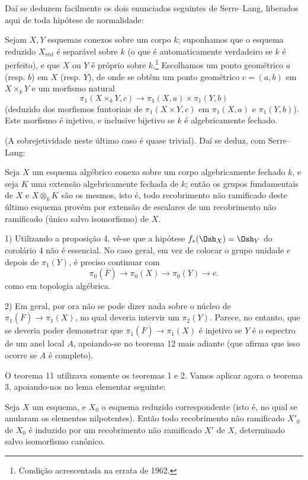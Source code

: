 Daí se deduzem facilmente os dois enunciados seguintes de Serre--Lang,
liberados aqui de toda hipótese de normalidade:

 Sejam $X,Y$ esquemas conexos sobre um corpo $k$;
suponhamos que o esquema reduzido $X_{\mathrm{réd}}$ é separável sobre $k$
(o que é automaticamente verdadeiro se $k$ é perfeito), e que $X$ ou $Y$ é
próprio sobre $k$.\footnote{Condição acrescentada na errata de 1962.}
Escolhamos um ponto geométrico $a$ (resp. $b$) em $X$ (resp. $Y$), de onde se
obtêm um ponto geométrico $c=(a,b)$ em $X\times_kY$ e um morfismo natural
\[
  \pi_1(X\times_kY,c)\longrightarrow
  \pi_1(X,a)\times\pi_1(Y,b)
\]
(deduzido dos morfismos funtoriais de $\pi_1(X\times Y,c)$ em $\pi_1(X,a)$
e $\pi_1(Y,b)$). Este morfismo é injetivo, e inclusive bijetivo se $k$ é
algebricamente fechado.

(A sobrejetividade neste último caso é quase trivial). Daí se deduz,
com Serre--Lang:

 Seja $X$ um esquema algébrico conexo sobre um corpo
algebricamente fechado $k$, e seja $K$ uma extensão algebricamente fechada
de $k$; então os grupos fundamentais de $X$ e $X\otimes_kK$ são os
mesmos, isto é, todo recobrimento não ramificado deste último esquema
provém por extensão de escalares de um recobrimento não ramificado (único
salvo isomorfismo) de $X$.


1) Utilizando a proposição 4, vê-se que a hipótese
$f_*(\Osh_X)=\Osh_Y$ do corolário 4 não é essencial. No caso geral, em vez
de colocar o grupo unidade $e$ depois de $\pi_1(Y)$, é preciso continuar com
\[
  \pi_0(\overline F)\longrightarrow\pi_0(X)
  \longrightarrow\pi_0(Y)\longrightarrow e.
\]
como em topologia algébrica.

2) Em geral, por ora não se pode dizer nada sobre o núcleo de
$\pi_1(\overline F)\longrightarrow\pi_1(X)$, no qual deveria intervir um
$\pi_2(Y)$. Parece, no entanto, que se deveria poder demonstrar que
$\pi_1(\overline F)\longrightarrow\pi_1(X)$ é injetivo se $Y$ é o espectro
de um anel local $A$, apoiando-se no teorema 12 mais adiante (que afirma que
isso ocorre se $A$ é completo).

O teorema 11 utilizava somente os teoremas 1 e 2. Vamos aplicar agora o
teorema 3, apoiando-nos no lema elementar seguinte:

 Seja $X$ um esquema, e $X_0$ o esquema reduzido correspondente
(isto é, no qual se anularam os elementos nilpotentes). Então todo
recobrimento não ramificado $X'_0$ de $X_0$ é induzido por um recobrimento
não ramificado $X'$ de $X$, determinado salvo isomorfismo canônico.

